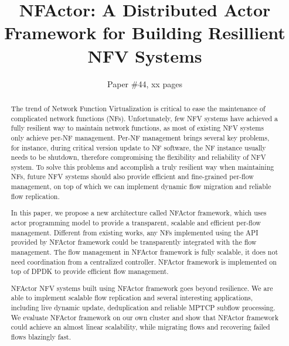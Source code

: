 \documentclass{sig-alternate-10pt}
\begin{document}
\title{\Large \bf NFActor: A Distributed Actor Framework for Building Resillient NFV Systems}

\author{
Paper \#44, xx pages
}

\maketitle

\begin{abstract}

The trend of Network Function Virtualization is critical to ease the maintenance of complicated network functions (NFs). Unfortunately, few NFV systems have achieved a fully resilient way to maintain network functions, as most of existing NFV systems only achieve per-NF management. Per-NF management brings several key problems, for instance, during critical version update to NF software, the NF instance usually needs to be shutdown, therefore compromising the flexibility and reliability of NFV system. To solve this problems and accomplish a truly resilient way when maintaining NFs, future NFV systems should also provide efficient and fine-grained per-flow management, on top of which we can implement dynamic flow migration and reliable flow replication.

In this paper, we propose a new architecture called NFActor framework, which uses actor programming model to provide a transparent, scalable and efficient per-flow management. Different from existing works, any NFs implemented using the API provided by NFActor framework could be transparently integrated with the flow management. The flow management in NFActor framework is fully scalable, it does not need coordination from a centralized controller. NFActor framework is implemented on top of DPDK to provide efficient flow management.

NFActor NFV systems built using NFActor framework goes beyond resilience. We are able to implement scalable flow replication and several interesting applications, including live dynamic update, deduplication and reliable MPTCP subflow processing. We evaluate NFActor framework on our own cluster and show that NFActor framework could achieve an almost linear scalability, while migrating flows and recovering failed flows blazingly fast.




\end{abstract}
\end{document}

